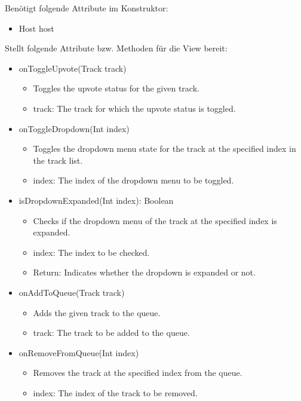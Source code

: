 \documentclass[oneside, ngerman]{sdqtechreport}
\begin{document}
Benötigt folgende Attribute im Konstruktor:
\begin{itemize}
    \item Host host
\end{itemize}
Stellt folgende Attribute bzw. Methoden für die View bereit:
\begin{itemize}

    \item onToggleUpvote(Track track)
        \begin{itemize}
            \item Toggles the upvote status for the given track.
            \item track: The track for which the upvote status is toggled.
        \end{itemize}
    \item onToggleDropdown(Int index)
        \begin{itemize}
            \item Toggles the dropdown menu state for the track at the specified index in the track list.
            \item index: The index of the dropdown menu to be toggled.
        \end{itemize}
    \item isDropdownExpanded(Int index): Boolean
        \begin{itemize}
            \item Checks if the dropdown menu of the track at the specified index is expanded.
            \item index: The index to be checked.
            \item Return: Indicates whether the dropdown is expanded or not.
        \end{itemize}
    \item onAddToQueue(Track track)
        \begin{itemize}
            \item Adds the given track to the queue.
            \item track: The track to be added to the queue.
        \end{itemize}
    \item onRemoveFromQueue(Int index)
        \begin{itemize}
            \item Removes the track at the specified index from the queue.
            \item index: The index of the track to be removed.
        \end{itemize}

\end{itemize}
\end{document}
